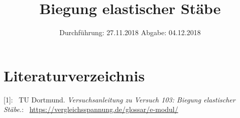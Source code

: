 

\subject{Nr. 103}
\title{Biegung elastischer Stäbe}
\date{%
  Durchführung: 27.11.2018
  \hspace{3em}
  Abgabe: 04.12.2018
}



\maketitle
\thispagestyle{empty}
\tableofcontents
\newpage






\printbibliography{}

\section{Literaturverzeichnis}

[1]: \ TU Dortmund. \textit{Versuchsanleitung zu Versuch 103: Biegung elastischer Stäbe.}\newline
[2]: \ \url{https://vergleichsspannung.de/glossar/e-modul/}\newline


